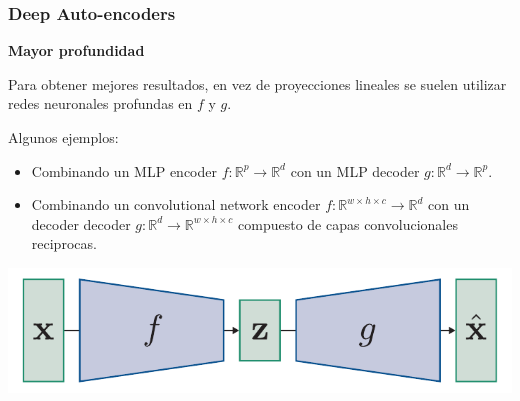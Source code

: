 \documentclass[aspectratio=169]{beamer}
\newenvironment{blockm}[1]{%
  \begin{block}{\textbf{#1}}%
  }{%
  \end{block}%
  \vspace{1em}%
}
\begin{document}


\begin{frame}[t]\frametitle{Deep Auto-encoders}
  \begin{blockm}{Mayor profundidad}
    Para obtener mejores resultados, en vez de proyecciones lineales se suelen utilizar redes neuronales profundas en $f$ y $g$.
  \end{blockm}
  Algunos ejemplos:
  \begin{itemize}
    \item Combinando un MLP encoder $f : \mathbb{R}^p \to \mathbb{R}^d$ con un MLP decoder $g: \mathbb{R}^d \to \mathbb{R}^p$.
    \item Combinando un convolutional network encoder $f : \mathbb{R}^{w\times h \times c} \to \mathbb{R}^d$ con un decoder decoder $g : \mathbb{R}^d \to \mathbb{R}^{w\times h \times c}$ compuesto de capas convolucionales reciprocas.
  \end{itemize}
  \vspace{.3cm}
  \includegraphics[width=.5\textwidth, center]{imgs/tema4/aenc/deep_aenc.pdf}\\
\end{frame}
\end{document}
